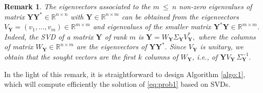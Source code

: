 \documentclass{article}
\newcommand{\Rr}{\mathds{R}}
\newcommand{\BBB}{\mathbf{Y}}
\newcommand{\ie}{\textit{i.e.}, }
\newtheorem{remark}{Remark}
\def\remCH#1{{\noindent\color{red}{{\footnotesize [CH: #1]}}}}
\begin{document}
\begin{remark}\label{rem:1}
The   eigenvectors  associated to the $m~\le~n$  non-zero eigenvalues of  matrix  $\BBB\BBB^*\in \Rr^{n \times n}$ with   $ \BBB \in \Rr^{n \times m}$ can be obtained {from} %
  the eigenvectors $ V_\BBB=(v_1,...,v_{m}) \in \Rr^{m \times m}$
 and eigenvalues  %
  of the smaller  matrix $\BBB^*\BBB \in \Rr^{m\times m}$. Indeed,
the SVD  of   a matrix  $ \BBB$ of rank  $m$ is %
$\BBB=  W_\BBB\Sigma_\BBB    V_\BBB^*,$
 where the %
  columns %
  of  matrix  $  W_\BBB \in \Rr^{n \times m} $ are the eigenvectors of $\BBB\BBB^*$. %
  Since $  V_\BBB$ is unitary, we obtain that the sought vectors are the {first $k$} %
  columns of  $ W_\BBB$, \ie of $ \BBB  V_\BBB \,\Sigma_\BBB^{-1}.$
  \end{remark}



In the light of  this remark, it is straightforward to design Algorithm \ref{algo:1}, which will      compute efficiently  the solution  of \eqref{eq:prob1}  based on  SVDs.
\end{document}
